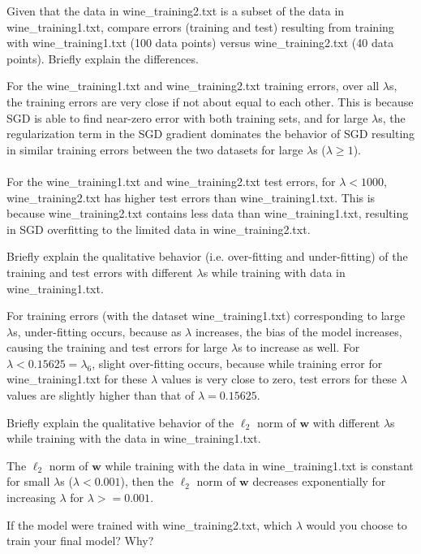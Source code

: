 \problem[4]
Given that the data in wine\_training2.txt is a subset of the data in wine\_training1.txt, compare errors (training and test) resulting from training with wine\_training1.txt (100 data points) versus wine\_training2.txt (40 data points). Briefly explain the differences.

For the wine\_training1.txt and wine\_training2.txt training errors, over all $\lambda$s, the training errors are very close if not about equal to each other. This is because SGD is able to find near-zero error with both training sets, and for large $\lambda$s, the regularization term in the SGD gradient dominates the behavior of SGD resulting in similar training errors between the two datasets for large $\lambda$s ($\lambda \geq 1$).\\
\\
For the wine\_training1.txt and wine\_training2.txt test errors, for $\lambda < 1000$, wine\_training2.txt has higher test errors than wine\_training1.txt. This is because wine\_training2.txt contains less data than wine\_training1.txt, resulting in SGD overfitting to the limited data in wine\_training2.txt.

\problem[4]
Briefly explain the qualitative behavior (i.e. over-fitting and under-fitting) of the training and test errors with different $\lambda$s while training with data in wine\_training1.txt.

For training errors (with the dataset wine\_training1.txt) corresponding to large $\lambda$s, under-fitting occurs, because as $\lambda$ increases, the bias of the model increases, causing the training and test errors for large $\lambda$s to increase as well. For $\lambda < 0.15625 = \lambda_6$, slight over-fitting occurs, because while training error for wine\_training1.txt for these $\lambda$ values is very close to zero, test errors for these $\lambda$ values are slightly higher than that of $\lambda = 0.15625$.

\problem[4]
Briefly explain the qualitative behavior of the $\ell_2$ norm of $\textbf{w}$ with different $\lambda$s while training with the data in wine\_training1.txt.

The $\ell_2$ norm of $\textbf{w}$ while training with the data in wine\_training1.txt is constant for small $\lambda$s ($\lambda < 0.001$), then the $\ell_2$ norm of $\textbf{w}$ decreases exponentially for increasing $\lambda$ for $\lambda >= 0.001$.

\problem[4]
If the model were trained with wine\_training2.txt, which $\lambda$ would you choose to train your final model? Why?

